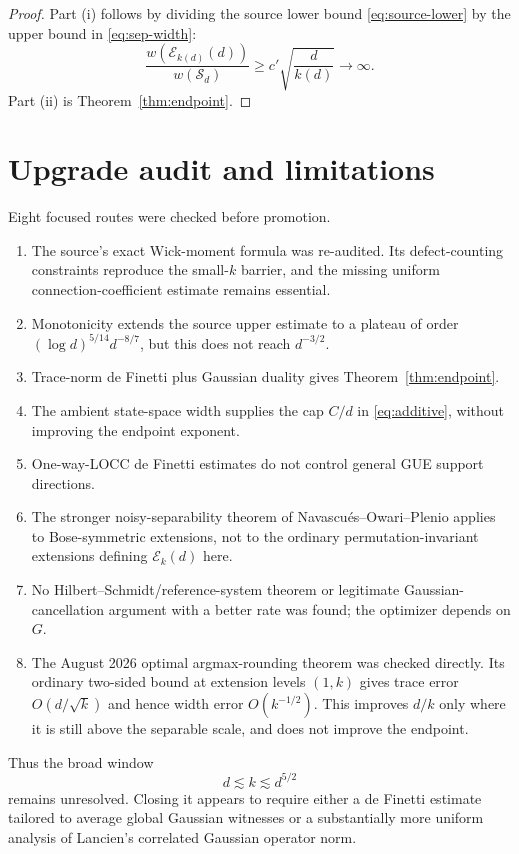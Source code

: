 \documentclass[11pt]{article}
\newcommand{\Eset}{\mathcal E}
\newcommand{\Sep}{\mathcal S}
\begin{document}
\begin{proof}
Part (i) follows by dividing the source lower bound \eqref{eq:source-lower} by the upper bound in \eqref{eq:sep-width}:
\[
 \frac{w(\Eset_{k(d)}(d))}{w(\Sep_d)}
 \geq c'\sqrt{\frac d{k(d)}}\longrightarrow\infty.
\]
Part (ii) is Theorem~\ref{thm:endpoint}.
\end{proof}

\section{Upgrade audit and limitations}

Eight focused routes were checked before promotion.

\begin{enumerate}[leftmargin=*,label=\arabic*.,itemsep=0.4em]
 \item The source's exact Wick-moment formula was re-audited.  Its defect-counting constraints reproduce the small-$k$ barrier, and the missing uniform connection-coefficient estimate remains essential.
 \item Monotonicity extends the source upper estimate to a plateau of order $(\log d)^{5/14}d^{-8/7}$, but this does not reach $d^{-3/2}$.
 \item Trace-norm de Finetti plus Gaussian duality gives Theorem~\ref{thm:endpoint}.
 \item The ambient state-space width supplies the cap $C/d$ in \eqref{eq:additive}, without improving the endpoint exponent.
 \item One-way-LOCC de Finetti estimates do not control general GUE support directions.
 \item The stronger noisy-separability theorem of Navascu\'es--Owari--Plenio applies to Bose-symmetric extensions, not to the ordinary permutation-invariant extensions defining $\Eset_k(d)$ here.
 \item No Hilbert--Schmidt/reference-system theorem or legitimate Gaussian-cancellation argument with a better rate was found; the optimizer depends on $G$.
 \item The August 2026 optimal argmax-rounding theorem was checked directly.  Its ordinary two-sided bound at extension levels $(1,k)$ gives trace error $O(d/\sqrt{k})$ and hence width error $O(k^{-1/2})$.  This improves $d/k$ only where it is still above the separable scale, and does not improve the endpoint.
\end{enumerate}

Thus the broad window
\[
 d\lesssim k\lesssim d^{5/2}
\]
remains unresolved.  Closing it appears to require either a de Finetti estimate tailored to average global Gaussian witnesses or a substantially more uniform analysis of Lancien's correlated Gaussian operator norm.
\end{document}
